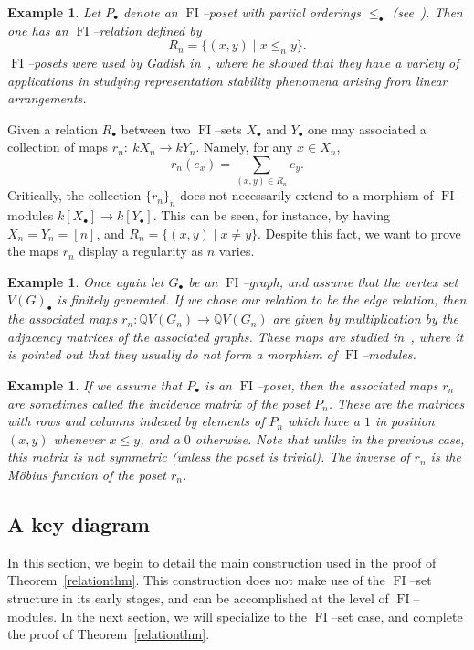\documentclass[10pt]{amsart}
\DeclareMathOperator{\FI}{FI}
\newcommand{\Q}{\mathbb{Q}}
\newcommand{\dt}{\bullet}
\newtheorem{example}[theorem]{Example}
\theoremstyle{definition}
\begin{document}
\begin{example}
Let $P_\dt$ denote an $\FI$--poset with partial orderings $\leq_\dt$ (see~\cite{G}). Then one has an $\FI$--relation defined by
\[
R_n = \{(x,y) \mid x \leq_n y\}.
\]
$\FI$--posets were used by Gadish in~\cite{G}, where he showed that they have a variety of applications in studying representation stability phenomena arising from linear arrangements.
\end{example}

Given a relation $R_\dt$ between two $\FI$--sets $X_\dt$ and $Y_\dt$ one may associated a collection of maps $r_n: \ kX_n \rightarrow kY_n$. Namely, for any $x \in X_n$,
\[
r_n(e_x) = \sum_{(x,y) \in R_n} e_y.
\]
Critically, the collection $\{r_n\}_n$ does not necessarily extend to a morphism of $\FI$--modules $k[X_\dt] \rightarrow k[Y_\dt]$. This can be seen, for instance, by having $X_n = Y_n = [n]$, and $R_n = \{(x,y) \mid x \neq y\}$. Despite this fact, we want to prove the maps $r_n$ display a regularity as $n$ varies.

\begin{example}
Once again let $G_\dt$ be an $\FI$--graph, and assume that the vertex set $V(G)_\dt$ is finitely generated. If we chose our relation to be the edge relation, then the associated maps $r_n: \Q V(G_n) \rightarrow \Q V(G_n)$ are given by multiplication by the adjacency matrices of the associated graphs. These maps are studied in~\cite{RW}, where it is pointed out that they usually do not form a morphism of $\FI$--modules.
\end{example}

\begin{example}
If we assume that $P_\dt$ is an $\FI$--poset, then the associated maps $r_n$ are sometimes called the incidence matrix of the poset $P_n$. These are the matrices with rows and columns indexed by elements of $P_n$ which have a $1$ in position $(x,y)$ whenever $x \leq y$, and a $0$ otherwise. Note that unlike in the previous case, this matrix is not symmetric (unless the poset is trivial). The inverse of $r_n$ is the M{\"o}bius function of the poset $r_n$.
\end{example}

\subsection{A key diagram}\label{keydiagram}

In this section, we begin to detail the main construction used in the proof of Theorem~\ref{relationthm}. This construction does not make use of the $\FI$--set structure in its early stages, and can be accomplished at the level of $\FI$--modules. In the next section, we will specialize to the $\FI$--set case, and complete the proof of Theorem~\ref{relationthm}.
\end{document}

